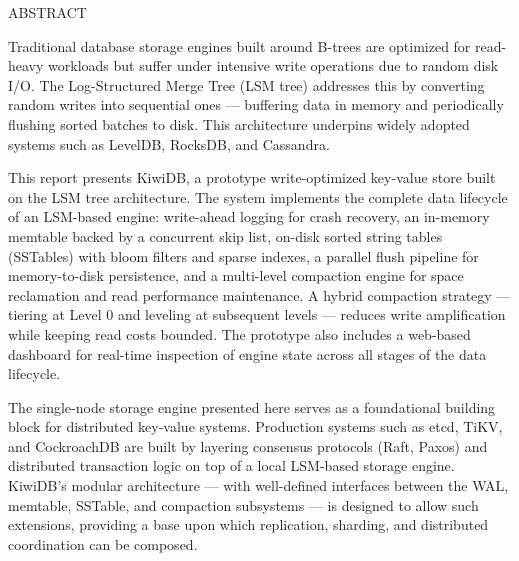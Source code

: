 \documentclass[oneside,a4paper,12pt]{book}
\begin{document}
\newpage
{\bfseries \fontsize{14}{17} \selectfont \centerline{ABSTRACT}
\vspace*{2\baselineskip}}

\setlength{\parindent}{5em}

Traditional database storage engines built around B-trees are optimized for read-heavy workloads but suffer under intensive write operations due to random disk I/O. The Log-Structured Merge Tree (LSM tree) addresses this by converting random writes into sequential ones --- buffering data in memory and periodically flushing sorted batches to disk. This architecture underpins widely adopted systems such as LevelDB, RocksDB, and Cassandra.

This report presents KiwiDB, a prototype write-optimized key-value store built on the LSM tree architecture. The system implements the complete data lifecycle of an LSM-based engine: write-ahead logging for crash recovery, an in-memory memtable backed by a concurrent skip list, on-disk sorted string tables (SSTables) with bloom filters and sparse indexes, a parallel flush pipeline for memory-to-disk persistence, and a multi-level compaction engine for space reclamation and read performance maintenance. A hybrid compaction strategy --- tiering at Level 0 and leveling at subsequent levels --- reduces write amplification while keeping read costs bounded. The prototype also includes a web-based dashboard for real-time inspection of engine state across all stages of the data lifecycle.

The single-node storage engine presented here serves as a foundational building block for distributed key-value systems. Production systems such as etcd, TiKV, and CockroachDB are built by layering consensus protocols (Raft, Paxos) and distributed transaction logic on top of a local LSM-based storage engine. KiwiDB's modular architecture --- with well-defined interfaces between the WAL, memtable, SSTable, and compaction subsystems --- is designed to allow such extensions, providing a base upon which replication, sharding, and distributed coordination can be composed.

\frontmatter
\pagestyle{frontmatter}
\setlength{\parindent}{5em}

\newcommand{\tocentry}[2]{\noindent #1 \dotfill\ #2\\[4pt]}
\newcommand{\tocentrynum}[3]{\noindent #1\hspace{1.5em}#2 \dotfill\ #3\\[4pt]}
\end{document}
